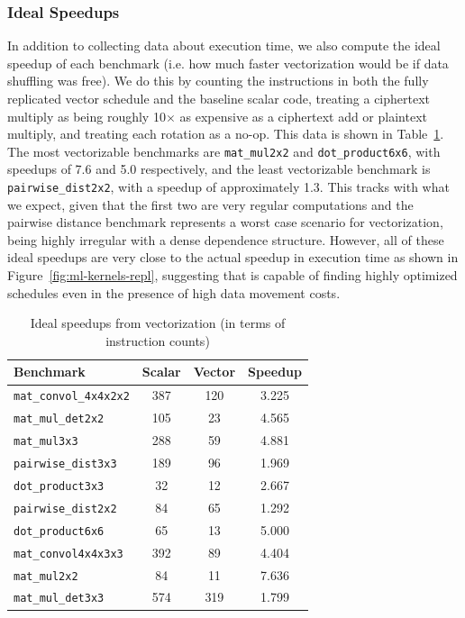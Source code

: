 \subsubsection*{Ideal Speedups}
In addition to collecting data about execution time, we also compute the ideal speedup of each benchmark (i.e. how much faster vectorization would be if data shuffling was free).
We do this by counting the instructions in both the fully replicated vector schedule and the baseline scalar code, treating a ciphertext multiply as being roughly 10$\times$ as expensive as a ciphertext add or plaintext multiply, and treating each rotation as a no-op.
This data is shown in Table~\ref{tab:ideal-speedup}.
The most vectorizable benchmarks are \texttt{mat\_mul2x2} and \texttt{dot\_product6x6}, with speedups of 7.6 and 5.0 respectively, and the least vectorizable benchmark is \texttt{pairwise\_dist2x2}, with a speedup of approximately 1.3.
This tracks with what we expect, given that the first two are very regular computations and the pairwise distance benchmark represents a worst case scenario for vectorization, being highly irregular with a dense dependence structure.
However, all of these ideal speedups are very close to the actual speedup in execution time as shown in Figure~\ref{fig:ml-kernels-repl}, suggesting that \system is capable of finding highly optimized schedules even in the presence of high data movement costs.


\begin{table}
    \begin{tabular}{|l|c|c|c|}
        \toprule    
        Benchmark & Scalar & Vector & Speedup\\\midrule
        \texttt{mat\_convol\_4x4x2x2} & 387 & 120 & 3.225\\
        \texttt{mat\_mul\_det2x2} & 105 & 23 & 4.565\\
        \texttt{mat\_mul3x3} & 288 & 59 & 4.881\\
        \texttt{pairwise\_dist3x3} & 189 & 96 & 1.969\\
        \texttt{dot\_product3x3} & 32 & 12 & 2.667\\
        \texttt{pairwise\_dist2x2} & 84 & 65 & 1.292\\
        \texttt{dot\_product6x6} & 65 & 13 & 5.000\\
        \texttt{mat\_convol4x4x3x3} & 392 & 89 & 4.404\\
        \texttt{mat\_mul2x2} & 84 & 11 & 7.636\\
        \texttt{mat\_mul\_det3x3} & 574 & 319 & 1.799\\\bottomrule
    \end{tabular}
    \caption{Ideal speedups from vectorization (in terms of instruction counts)}\label{tab:ideal-speedup}
\end{table}


